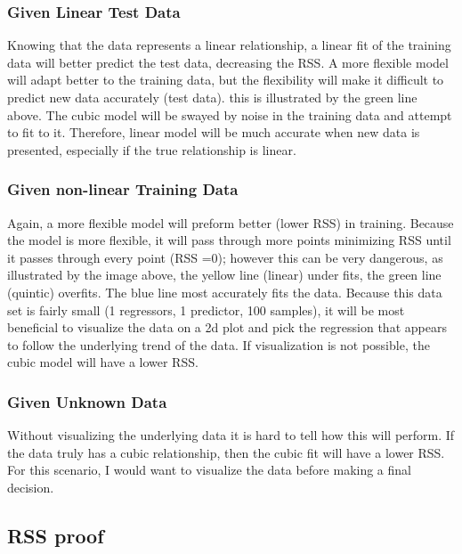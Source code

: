 \documentclass[11pt]{article}
\begin{document}
    \subsubsection{Given Linear Test Data}\label{given-linear-test-data}

Knowing that the data represents a linear relationship, a linear fit of
the training data will better predict the test data, decreasing the RSS.
A more flexible model will adapt better to the training data, but the
flexibility will make it difficult to predict new data accurately (test
data). this is illustrated by the green line above. The cubic model will
be swayed by noise in the training data and attempt to fit to it.
Therefore, linear model will be much accurate when new data is
presented, especially if the true relationship is linear.

    \subsubsection{Given non-linear Training
Data}\label{given-non-linear-training-data}

Again, a more flexible model will preform better (lower RSS) in
training. Because the model is more flexible, it will pass through more
points minimizing RSS until it passes through every point (RSS =0);
however this can be very dangerous, as illustrated by the image above,
the yellow line (linear) under fits, the green line (quintic) overfits.
The blue line most accurately fits the data. Because this data set is
fairly small (1 regressors, 1 predictor, 100 samples), it will be most
beneficial to visualize the data on a 2d plot and pick the regression
that appears to follow the underlying trend of the data. If
visualization is not possible, the cubic model will have a lower RSS.

    \subsubsection{Given Unknown Data}\label{given-unknown-data}

Without visualizing the underlying data it is hard to tell how this will
perform. If the data truly has a cubic relationship, then the cubic fit
will have a lower RSS. For this scenario, I would want to visualize the
data before making a final decision.

    \subsection{RSS proof}\label{rss-proof}
\end{document}
